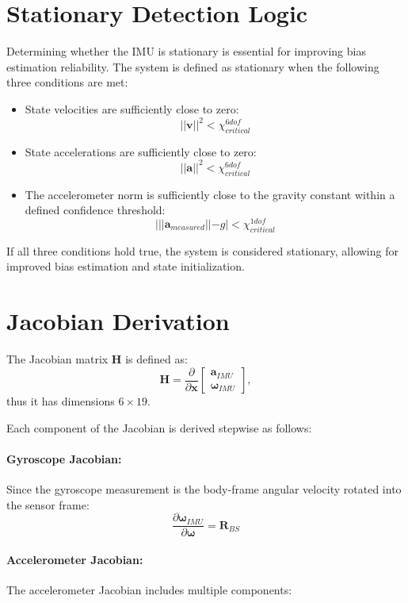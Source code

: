 \documentclass{article}
\begin{document}
	\section*{Stationary Detection Logic}
	Determining whether the IMU is stationary is essential for improving bias estimation reliability. The system is defined as stationary when the following three conditions are met:

	\begin{itemize}
		\item State velocities are sufficiently close to zero:
		\[
		||\mathbf{v}||^2 < \chi_{critical}^{6dof}
		\]

		\item State accelerations are sufficiently close to zero:
		\[
		||\mathbf{a}||^2 < \chi_{critical}^{6dof}
		\]

		\item The accelerometer norm is sufficiently close to the gravity constant within a defined confidence threshold:
		\[
		| ||\mathbf{a}_{measured}|| - g | < \chi_{critical}^{1dof}
		\]

	\end{itemize}

	If all three conditions hold true, the system is considered stationary, allowing for improved bias estimation and state initialization.
	\section*{Jacobian Derivation}
	The Jacobian matrix $\mathbf{H}$ is defined as:
	\[
	\mathbf{H} =
	\frac{\partial}{\partial \mathbf{x}}
	\begin{bmatrix}
		\mathbf{a}_{IMU}\\
		\boldsymbol{\omega}_{IMU}
	\end{bmatrix},
	\]
	thus it has dimensions $6\times19$.

	Each component of the Jacobian is derived stepwise as follows:

	\paragraph{Gyroscope Jacobian:} Since the gyroscope measurement is the body-frame angular velocity rotated into the sensor frame:
	\[
	\frac{\partial \mathbf{\omega}_{IMU}}{\partial \boldsymbol{\omega}} = \mathbf{R}_{BS}
	\]

	\paragraph{Accelerometer Jacobian:} The accelerometer Jacobian includes multiple components:
\end{document}
